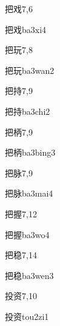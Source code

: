 \begin{entry}{把戏}{7,6}
  \begin{phonetics}{把戏}{ba3xi4}
  \end{phonetics}
\end{entry}

\begin{entry}{把玩}{7,8}
  \begin{phonetics}{把玩}{ba3wan2}
  \end{phonetics}
\end{entry}

\begin{entry}{把持}{7,9}
  \begin{phonetics}{把持}{ba3chi2}
  \end{phonetics}
\end{entry}

\begin{entry}{把柄}{7,9}
  \begin{phonetics}{把柄}{ba3bing3}
  \end{phonetics}
\end{entry}

\begin{entry}{把脉}{7,9}
  \begin{phonetics}{把脉}{ba3mai4}
  \end{phonetics}
\end{entry}

\begin{entry}{把握}{7,12}
  \begin{phonetics}{把握}{ba3wo4}
  \end{phonetics}
\end{entry}

\begin{entry}{把稳}{7,14}
  \begin{phonetics}{把稳}{ba3wen3}
  \end{phonetics}
\end{entry}

\begin{entry}{投资}{7,10}
  \begin{phonetics}{投资}{tou2zi1}
  \end{phonetics}
\end{entry}


